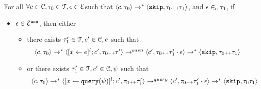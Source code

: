\begin{lem}
\label{lem:inv_event}
For all $\forall c\in \mathcal{C}, \mathtt{\tau}_0 \in \mathcal{T}, \mathtt{\epsilon} \in \mathcal{E}$such that 
$\langle c, \mathtt{\tau}_0 \rangle \rightarrow^* \langle \mathtt{skip}, \mathtt{\tau}_0 {\scriptscriptstyle ++} \mathtt{\tau}_1 \rangle$, 
and $\mathtt{\epsilon} \in_{\mathtt{e}} \mathtt{\tau}_1$, if 
\begin{itemize}
	\item $\mathtt{\epsilon} \in \mathcal{E}^{\mathtt{{asn}}}$, then either
	\begin{itemize}

	 \item there exists $\mathtt{\tau}_1' \in \mathcal{T}, c' \in \mathcal{C}, e$ such that
\[
\begin{array}{l}
		\langle c, \mathtt{\tau}_0 \rangle \rightarrow^* \langle  [\mathrel{ x \leftarrow e }]^l;c', \mathtt{\tau}_0  {\scriptscriptstyle ++}  \mathtt{\tau}' \rangle \rightarrow^{assn}
		\langle c', \mathtt{\tau}_0 {\scriptscriptstyle ++} \mathtt{\tau}_1'\cdot \mathtt{\epsilon} \rangle \rightarrow^{*}
		\langle \mathtt{skip}, \mathtt{\tau}_0  {\scriptscriptstyle ++}  \mathtt{\tau}_1 \rangle
\end{array}
\]
\item or there exists $\mathtt{\tau}_1' \in \mathcal{T}, c' \in \mathcal{C}, \psi$ such that 
\[
\begin{array}{l}
		\langle c, \mathtt{\tau}_0 \rangle \rightarrow^* \langle  [\mathrel{ x \leftarrow {\tt query}(\psi) }]^l;c', \mathtt{\tau}_0 {\scriptscriptstyle ++} \mathtt{\tau}_1' \rangle \rightarrow^{query}
		\langle c', \mathtt{\tau}_0  {\scriptscriptstyle ++}  \mathtt{\tau}_1' \cdot \mathtt{\epsilon}  \rangle \rightarrow^{*}
		\langle  \mathtt{skip}, \mathtt{\tau}_0\mathtt{\tau}_1 \rangle
\end{array}
\]
\end{itemize}


\end{itemize}
\end{lem}
